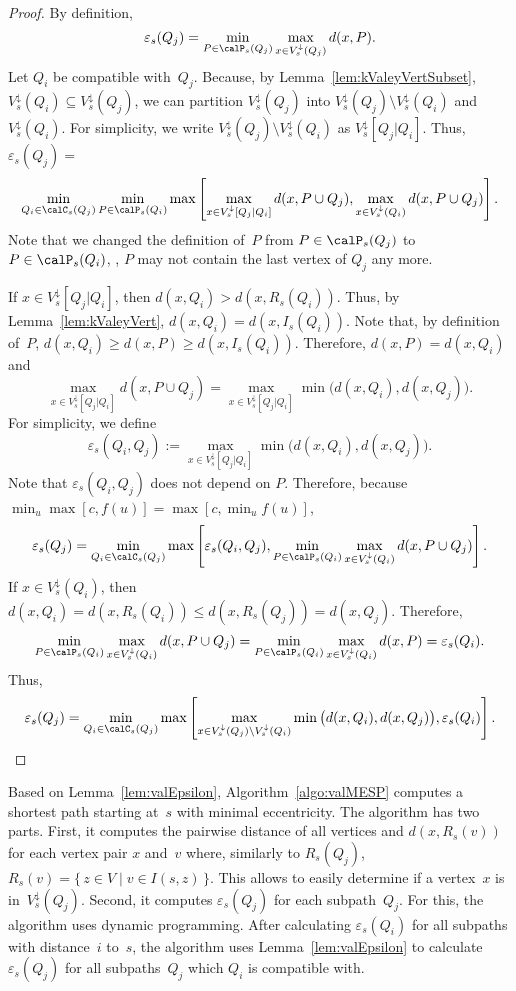 \begin{proof}
By definition,
\[
    \varepsilon_s(Q_j)
    =
    \min_{P \in \calP_s(Q_j)} \max_{x \in V^\downarrow_s(Q_j)} d(x, P).
\]
Let $Q_{i}$ be compatible with~$Q_j$.
Because, by Lemma~\ref{lem:kValeyVertSubset}, $V^\downarrow_s(Q_{i}) \subseteq V^\downarrow_s(Q_j)$, we can partition $V^\downarrow_s(Q_j)$ into $V^\downarrow_s(Q_j) \setminus V^\downarrow_s(Q_{i})$ and $V^\downarrow_s(Q_{i})$.
For simplicity, we write $V^\downarrow_s(Q_j) \setminus V^\downarrow_s(Q_{i})$ as $V^\downarrow_s[Q_j|Q_i]$.
Thus, $\varepsilon_s(Q_j) =$
\[
    \min_{Q_{i} \in \calC_s(Q_j)} \min_{P \in \calP_s(Q_{i})} \max \left[
        \max_{x \in V^\downarrow_s[Q_j|Q_i]} d(x, P \cup Q_j),
        \max_{x \in V^\downarrow_s(Q_{i})} d(x, P \cup Q_j)
    \right].
\]
Note that we changed the definition of~$P$ from $P \in \calP_s(Q_j)$ to $P \in \calP_s(Q_{i})$, \ie, $P$ may not contain the last vertex of $Q_j$ any more.

If $x \in V^\downarrow_s[Q_j|Q_i]$, then $d(x, Q_{i}) > d(x, R_s(Q_{i}))$.
Thus, by Lemma~\ref{lem:kValeyVert}, $d(x, Q_{i}) = d(x, I_s(Q_{i}))$.
Note that, by definition of~$P$, $d(x, Q_i) \geq d(x, P) \geq d(x, I_s(Q_i))$.
Therefore, $d(x, P) = d(x, Q_i)$ and
\[
    \max_{x \in V^\downarrow_s[Q_j|Q_i]} d(x, P \cup Q_j)
    =
    \max_{x \in V^\downarrow_s[Q_j|Q_i]} \min \big( d(x, Q_{i}), d(x, Q_{j}) \big).
\]
For simplicity, we define
\[
    \varepsilon_s(Q_i, Q_j)
    :=
    \max_{x \in V^\downarrow_s[Q_j|Q_i]} \min \big( d(x, Q_{i}), d(x, Q_{j}) \big).
\]
Note that $\varepsilon_s(Q_i, Q_j)$ does not depend on $P$.
Therefore, because $\min_{u} \max [ c, f(u) ] = \max [ c, \min_{u} f(u) ]$,
\[
    \varepsilon_s(Q_j)
    =
    \min_{Q_{i} \in \calC_s(Q_j)} \max \left[
        \varepsilon_s(Q_i, Q_j),
        \min_{P \in \calP_s(Q_{i})} \max_{x \in V^\downarrow_s(Q_{i})} d(x, P \cup Q_j)
    \right].
\]
If $x \in V^\downarrow_s(Q_{i})$, then $d(x, Q_{i}) = d(x, R_s(Q_{i})) \leq d(x, R_s(Q_j)) = d(x, Q_j)$.
Therefore,
\[
    \min_{P \in \calP_s(Q_{i})} \max_{x \in V^\downarrow_s(Q_{i})} d(x, P \cup Q_j)
    =
    \min_{P \in \calP_s(Q_{i})} \max_{x \in V^\downarrow_s(Q_{i})} d(x, P)
    =
    \varepsilon_s(Q_{i}).
\]
Thus,
\[
    \varepsilon_s(Q_j)
    =
    \min_{Q_{i} \in \calC_s(Q_j)} \max \left[
        \max_{x \in V^\downarrow_s(Q_j) \setminus V^\downarrow_s(Q_{i})} \min \big( d(x, Q_{i}), d(x, Q_{j}) \big),
        \varepsilon_s(Q_{i})
    \right].
    \qedhere
\]
\end{proof}

Based on Lemma~\ref{lem:valEpsilon}, Algorithm~\ref{algo:valMESP} computes a shortest path starting at~$s$ with minimal eccentricity.
The algorithm has two parts.
First, it computes the pairwise distance of all vertices and $d(x, R_s(v))$ for each vertex pair $x$ and~$v$ where, similarly to $R_s(Q_j)$, $R_s(v) = \{ \, z \in V \mid v \in I(s, z) \, \}$.
This allows to easily determine if a vertex~$x$ is in~$V^\downarrow_s(Q_j)$.
Second, it computes $\varepsilon_s(Q_j)$ for each subpath~$Q_j$.
For this, the algorithm uses dynamic programming.
After calculating $\varepsilon_s(Q_i)$ for all subpaths with distance~$i$ to~$s$, the algorithm uses Lemma~\ref{lem:valEpsilon} to calculate $\varepsilon_s(Q_j)$ for all subpaths~$Q_j$ which $Q_i$ is compatible with.

